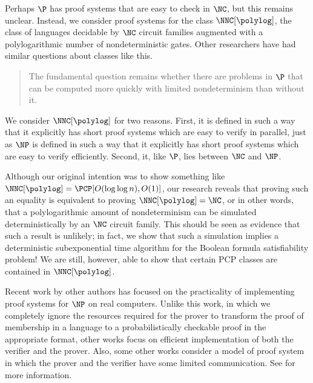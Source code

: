 %
%
%
%
Perhaps $\P$ has proof systems that are easy to check in $\NC$, but this remains unclear.
Instead, we consider proof systems for the class $\NNC[\polylog]$, the class of languages decidable by $\NC$ circuit families augmented with a polylogarithmic number of nondeterministic gates.
Other researchers have had similar questions about classes like this.
\begin{quote}
  The fundamental question remains whether there are problems in $\P$ that can be computed more quickly with limited nondeterminism than without it.~\autocite{bg93}
\end{quote}
We consider $\NNC[\polylog]$ for two reasons.
First, it is defined in such a way that it explicitly has short proof systems which are easy to verify in parallel, just as $\NP$ is defined in such a way that it explicitly has short proof systems which are easy to verify efficiently.
Second, it, like $\P$, lies between $\NC$ and $\NP$.

%
%
%
Although our original intention was to show something like $\NNC[\polylog] = \PCP[O(\loglog n), O(1)]$, our research reveals that proving such an equality is equivalent to proving $\NNC[\polylog] = \NC$, or in other words, that a polylogarithmic amount of nondeterminism can be simulated deterministically by an $\NC$ circuit family.
This should be seen as evidence that such a result is unlikely; in fact, we show that such a simulation implies a deterministic subexponential time algorithm for the Boolean formula satisfiability problem!
We are still, however, able to show that certain PCP classes are contained in $\NNC[\polylog]$.

%
%
Recent work by other authors has focused on the practicality of implementing proof systems for $\NP$ on real computers.
Unlike this work, in which we completely ignore the resources required for the prover to transform the proof of membership in a language to a probabilistically checkable proof in the appropriate format, other works focus on efficient implementation of both the verifier and the prover.
Also, some other works consider a model of proof system in which the prover and the verifier have some limited communication.
See \autocites{bcgt13}{gkr08}{smbw12}{svpbbw12}{trmp12} for more information.


